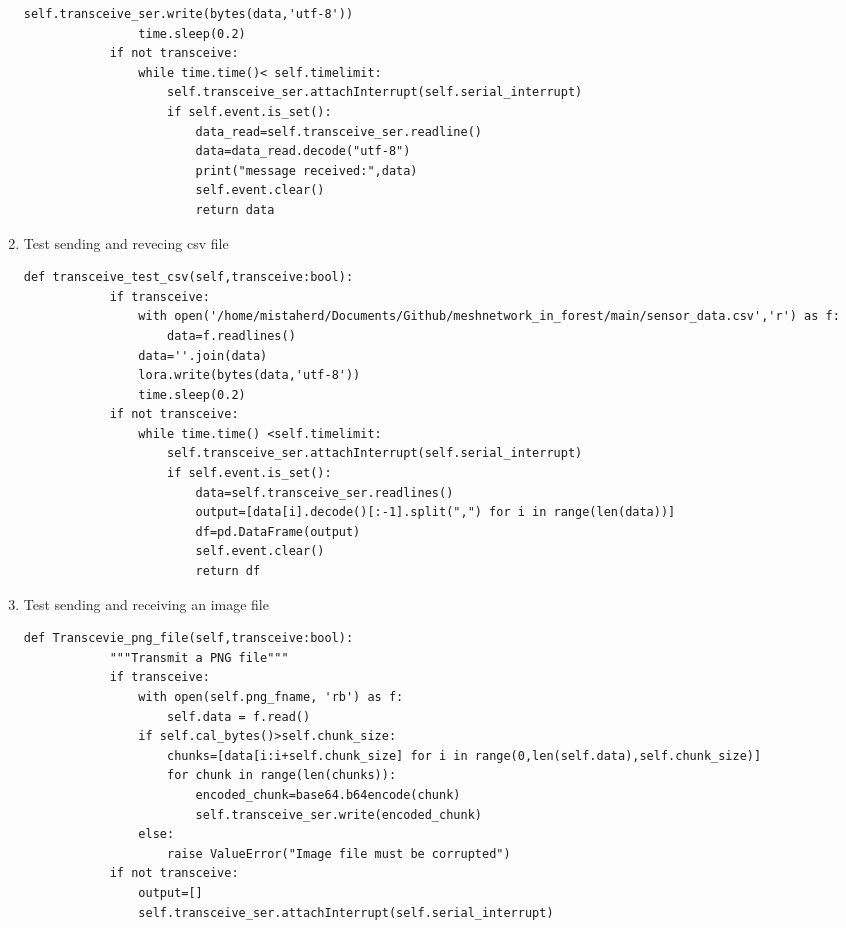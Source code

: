 \begin{enumerate}
\begin{lstlisting}[style=mystyle]
                self.transceive_ser.write(bytes(data,'utf-8'))
                time.sleep(0.2)
            if not transceive:
                while time.time()< self.timelimit:
                    self.transceive_ser.attachInterrupt(self.serial_interrupt)
                    if self.event.is_set():
                        data_read=self.transceive_ser.readline()
                        data=data_read.decode("utf-8")
                        print("message received:",data)
                        self.event.clear()
                        return data
    \end{lstlisting}
    \item Test sending and revecing csv file
    \begin{lstlisting}[style=mystyle]
        def transceive_test_csv(self,transceive:bool):
            if transceive:
                with open('/home/mistaherd/Documents/Github/meshnetwork_in_forest/main/sensor_data.csv','r') as f:
                    data=f.readlines()
                data=''.join(data)
                lora.write(bytes(data,'utf-8'))
                time.sleep(0.2)
            if not transceive:
                while time.time() <self.timelimit:
                    self.transceive_ser.attachInterrupt(self.serial_interrupt)
                    if self.event.is_set():
                        data=self.transceive_ser.readlines()
                        output=[data[i].decode()[:-1].split(",") for i in range(len(data))]
                        df=pd.DataFrame(output)
                        self.event.clear()
                        return df
    \end{lstlisting}
    \item Test sending and receiving an image file
    \begin{lstlisting}[style=mystyle]
        def Transcevie_png_file(self,transceive:bool):
            """Transmit a PNG file"""
            if transceive:
                with open(self.png_fname, 'rb') as f:
                    self.data = f.read()
                if self.cal_bytes()>self.chunk_size:
                    chunks=[data[i:i+self.chunk_size] for i in range(0,len(self.data),self.chunk_size)]
                    for chunk in range(len(chunks)):
                        encoded_chunk=base64.b64encode(chunk)
                        self.transceive_ser.write(encoded_chunk)
                else:
                    raise ValueError("Image file must be corrupted")
            if not transceive:
                output=[]
                self.transceive_ser.attachInterrupt(self.serial_interrupt)

\end{lstlisting}
\end{enumerate}
